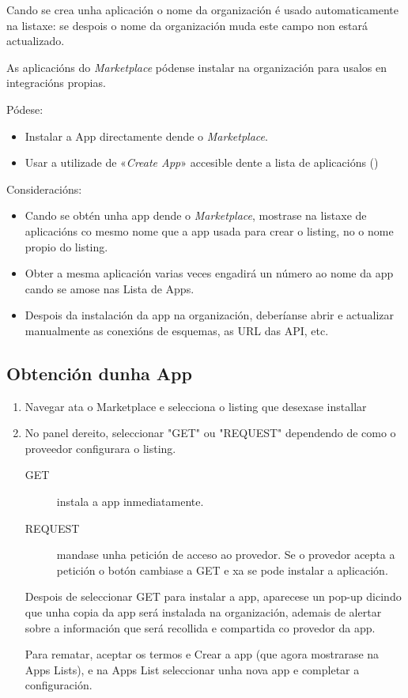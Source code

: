 Cando se crea unha aplicación o nome da organización é usado automaticamente na listaxe: se despois o nome da organización muda este campo non estará actualizado.

As aplicacións do \textit{Marketplace} pódense instalar na organización para usalos en integracións propias.

Pódese:

\begin{itemize}
    \item Instalar a App directamente dende o \textit{Marketplace}.
    \item Usar a utilizade de «\textit{Create App}» accesible dente a lista de aplicacións ()
\end{itemize}

Consideracións:

\begin{itemize}
    \item Cando se obtén unha app dende o \textit{Marketplace}, mostrase na listaxe de aplicacións co mesmo nome que a app usada para crear o listing, no o nome propio do listing.
    
    \item Obter a mesma aplicación varias veces engadirá un número ao nome da app cando  se amose nas Lista de Apps.
    
    \item Despois da instalación da app na organización, deberíanse abrir e actualizar manualmente as conexións de esquemas, as URL das API, etc.
\end{itemize}

\subsection{Obtención dunha App}

\begin{enumerate}
    \item Navegar ata o Marketplace e  selecciona o listing que desexase installar
    \item No panel dereito, seleccionar "GET" ou "REQUEST" dependendo de como o proveedor configurara o listing.
    
    \begin{description}
        \item[GET] instala a app inmediatamente.
        \item[REQUEST] mandase unha petición de acceso ao provedor. Se o provedor acepta a petición o botón cambiase a GET e xa se pode instalar a aplicación.
    \end{description}

	
	Despois de seleccionar GET para instalar a app, aparecese un pop-up dicindo que unha copia da app será instalada na organización, ademais de alertar sobre a información que será recollida e compartida co provedor da app.
	
	Para rematar, aceptar os termos e Crear a app (que agora mostrarase na Apps Lists), e na Apps List seleccionar unha nova app e completar a configuración.
\end{enumerate}

